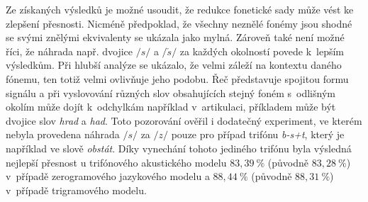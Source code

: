 


Ze získaných výsledků je možné usoudit, že redukce fonetické sady může vést ke zlepšení přesnosti.
Nicméně předpoklad, že všechny neznělé fonémy jsou shodné se svými znělými ekvivalenty se ukázala jako mylná.
Zároveň také není možné říci, že náhrada např. dvojice $/s/$ a $/\check{s}/$  za každých okolností povede  k~lepším výsledkům.
Při hlubší analýze se ukázalo, že velmi záleží na kontextu daného fónemu, ten totiž velmi ovlivňuje jeho podobu.
Řeč představuje spojitou formu signálu a při vyslovování různých slov obsahujících stejný foném s~odlišným okolím  může dojít  k~odchylkám například v~artikulaci, příkladem může být dvojice slov \textit{hrad} a \textit{had}.
Toto pozorování ověřil i dodatečný experiment, ve kterém nebyla provedena náhrada $/s/$ za $/z/$ pouze pro případ trifónu \textit{b-s+t}, který je například ve slově \textit{obstát}.
Díky vynechání tohoto jediného trifónu byla výsledná nejlepší přesnost u trifónového akustického modelu $83,39~\%$ (původně $83,28~\%$) v~případě zerogramového jazykového modelu a $88,44~\%$ (původně $88,31~\%$) v~případě trigramového modelu.

